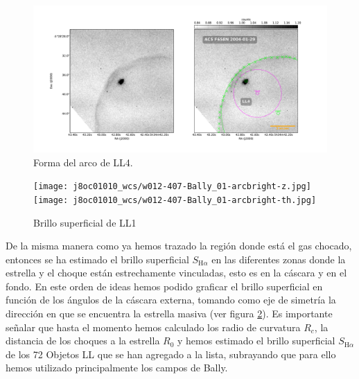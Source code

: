 \documentclass{article}
\newcommand\ha{\ensuremath{\mathrm{H}\alpha}}
\begin{document}
\begin{figure}
  \centering
  \includegraphics[width=\linewidth, trim=60 20 60 60, clip]{j8oc24010_wcs/LL4-Bally_24-images.pdf}
  \caption{Forma del arco de LL4.}
  \label{fig:LL4}
\end{figure}

\begin{figure}
  \centering
  \texttt{[image: j8oc01010\_wcs/w012-407-Bally\_01-arcbright-z.jpg]}
  \texttt{[image: j8oc01010\_wcs/w012-407-Bally\_01-arcbright-th.jpg]}
  \caption{Brillo superficial de LL1}
  \label{fig:brillo-LL1}
\end{figure}

De la misma manera como ya hemos trazado la región donde está el gas chocado, entonces se ha estimado el brillo superficial \(S_{\ha}\) en las diferentes zonas donde la estrella y el choque están estrechamente vinculadas, esto es en la cáscara y en el fondo. En este orden de ideas hemos podido graficar el brillo superficial en función de los ángulos de la cáscara externa, tomando como eje de simetría la dirección en que se encuentra la estrella masiva (ver figura \ref{fig:brillo-LL1}). Es importante señalar que hasta el momento hemos calculado los radio de curvatura \(R_{c}\), la distancia de los choques a la estrella \(R_{0}\) y hemos estimado el brillo superficial \(S_{\ha}\) de los 72 Objetos LL que se han agregado a la lista, subrayando que para ello hemos utilizado principalmente los campos de Bally. 



\end{document}
